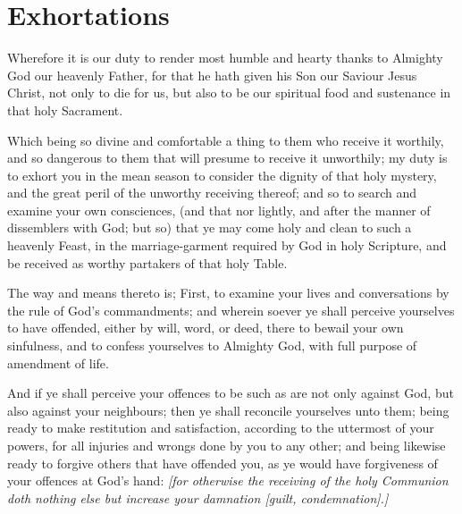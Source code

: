 \section{Exhortations}


Wherefore it is our duty to render most humble and hearty thanks to Almighty God our heavenly Father, for that he hath given his Son our Saviour Jesus Christ, not only to die for us, but also to be our spiritual food and sustenance in that holy Sacrament.

Which being so divine and comfortable a thing to them who receive it worthily, and so dangerous to them that will presume to receive it unworthily; my duty is to exhort you in the mean season to consider the dignity of that holy mystery, and the great peril of the unworthy receiving thereof; and so to search and examine your own consciences, (and that nor lightly, and after the manner of dissemblers with God; but so) that ye may come holy and clean to such a heavenly Feast, in the marriage-garment required by God in holy Scripture, and be received as worthy partakers of that holy Table.

The way and means thereto is; First, to examine your lives and conversations by the rule of God’s commandments; and wherein soever ye shall perceive yourselves to have offended, either by will, word, or deed, there to bewail your own sinfulness, and to confess yourselves to Almighty God, with full purpose of amendment of life. 

And if ye shall perceive your offences to be such as are not only against God, but also against your neighbours; then ye shall reconcile yourselves unto them; being ready to make restitution and satisfaction, according to the uttermost of your powers, for all injuries and wrongs done by you to any other; and being likewise ready to forgive others that have offended you, as ye would have forgiveness of your offences at God’s hand: \emph{[for otherwise the receiving of the holy Communion doth nothing else but increase your \emph{damnation} [guilt, condemnation].]}

